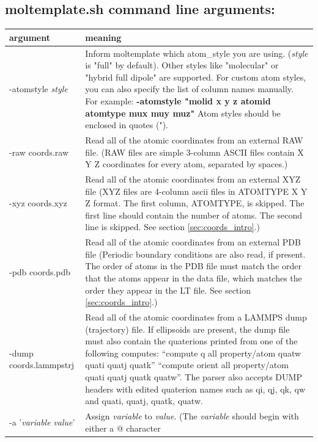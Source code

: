 \documentclass[11pt]{article}
\begin{document}
\subsection{moltemplate.sh command line arguments:}
\label{sec:args_table}
\begin{longtable}[h]{l|p{10cm}}
\textbf{argument} & \textbf{meaning}
\\
\hline
\hline
-atomstyle \textit{style}
&
Inform moltemplate which atom\_style you are using.
(\textit{style} is "full" by default).
Other styles like "molecular" or "hybrid full dipole" are supported.
For custom atom styles, you can also specify the list of column 
names manually.  For example:
\textbf{-atomstyle "molid x y z atomid atomtype mux muy muz"}
Atom styles should be enclosed in quotes (").
\\
\hline
-raw coords.raw
& 
Read all of the atomic coordinates from an external RAW file.
(RAW files are simple 3-column ASCII files contain X Y Z coordinates
 for every atom, separated by spaces.)
\\
\hline
-xyz coords.xyz
& 
Read all of the atomic coordinates from an external XYZ file 
(XYZ files are 4-column ascii files in ATOMTYPE X Y Z format. 
 The first column, ATOMTYPE, is skipped. 
 The first line should contain the number of atoms. 
 The second line is skipped. See section \ref{sec:coords_intro}.)
\\
\hline
-pdb coords.pdb
& 
Read all of the atomic coordinates from an external PDB file
(Periodic boundary conditions are also read, if present.
 The order of atoms in the PDB file
 must match the order that the atoms appear in the data file,
 which matches the order they appear in the LT file.
 See section \ref{sec:coords_intro}.)
\\
\hline
-dump coords.lammpstrj
&
Read all of the atomic coordinates from a LAMMPS dump (trajectory) file.
If ellipsoids are present, the dump file must also contain the quaterions
printed  from one of the following computes:
``compute q all property/atom quatw quati quatj quatk''
``compute orient all property/atom quati quatj quatk quatw''.
The parser also accepts DUMP headers with edited quaterion names
such as qi, qj, qk, qw and quati, quatj, quatk, quatw.
\\
\hline
-a '\textit{variable} \textit{value}'
& 
Assign \textit{variable} to \textit{value}.
(The \textit{variable} should begin with either a @ character 

\end{longtable}
\end{document}
